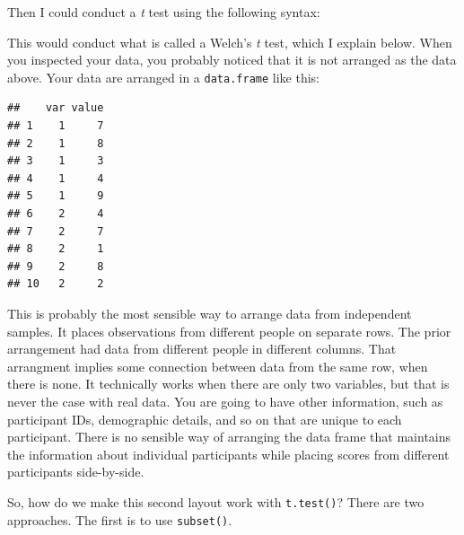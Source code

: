 \documentclass[
]{book}
\newenvironment{Shaded}{\begin{snugshade}}{\end{snugshade}}
\newcommand{\AttributeTok}[1]{\textcolor[rgb]{0.77,0.63,0.00}{#1}}
\newcommand{\DecValTok}[1]{\textcolor[rgb]{0.00,0.00,0.81}{#1}}
\newcommand{\FunctionTok}[1]{\textcolor[rgb]{0.00,0.00,0.00}{#1}}
\newcommand{\NormalTok}[1]{#1}
\newcommand{\SpecialCharTok}[1]{\textcolor[rgb]{0.00,0.00,0.00}{#1}}
\begin{document}
Then I could conduct a \emph{t} test using the following syntax:

\begin{Shaded}
\end{Shaded}

This would conduct what is called a Welch's \emph{t} test, which I explain below. When you inspected your data, you probably noticed that it is not arranged as the data above. Your data are arranged in a \texttt{data.frame} like this:

\begin{verbatim}
##    var value
## 1    1     7
## 2    1     8
## 3    1     3
## 4    1     4
## 5    1     9
## 6    2     4
## 7    2     7
## 8    2     1
## 9    2     8
## 10   2     2
\end{verbatim}

This is probably the most sensible way to arrange data from independent samples. It places observations from different people on separate rows. The prior arrangement had data from different people in different columns. That arrangment implies some connection between data from the same row, when there is none. It technically works when there are only two variables, but that is never the case with real data. You are going to have other information, such as participant IDs, demographic details, and so on that are unique to each participant. There is no sensible way of arranging the data frame that maintains the information about individual participants while placing scores from different participants side-by-side.

So, how do we make this second layout work with \texttt{t.test()}? There are two approaches. The first is to use \texttt{subset()}.

\begin{Shaded}
\end{Shaded}
\end{document}
